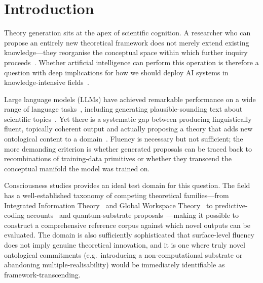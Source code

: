 \documentclass[pdflatex,sn-mathphys-num]{sn-jnl}
\begin{document}
\section{Introduction}
\label{sec:intro}

Theory generation sits at the apex of scientific cognition.  A researcher who
can propose an entirely new theoretical framework does not merely extend
existing knowledge---they reorganise the conceptual space within which further
inquiry proceeds~\cite{kuhn1962structure}.  Whether artificial intelligence can
perform this operation is therefore a question with deep implications for how we
should deploy AI systems in knowledge-intensive fields~\cite{findlay2025dissociating,miyanishi2024superficial}.

Large language models (LLMs) have achieved remarkable performance on a wide
range of language tasks~\cite{brown2020language,openai2023gpt4,geminiteam2023},
including generating plausible-sounding text about scientific
topics~\cite{stevenson2022gpt,organisciak2023beyond,zhang2025advancing}.  Yet there is a systematic
gap between producing linguistically fluent, topically coherent output and
actually proposing a theory that adds new ontological content to a
domain~\cite{boden2004creative,wiggins2006preliminary}.  Fluency is necessary
but not sufficient; the more demanding criterion is whether generated proposals
can be traced back to recombinations of training-data primitives or whether they
transcend the conceptual manifold the model was trained on.

Consciousness studies provides an ideal test domain for this question.  The
field has a well-established taxonomy of competing theoretical families---from
Integrated Information Theory~\cite{tononi2004information} and Global Workspace
Theory~\cite{baars2005global,dehaene2011experimental} to predictive-coding
accounts~\cite{friston2010free} and quantum-substrate
proposals~\cite{hameroff2014consciousness}---making it possible to construct a
comprehensive reference corpus against which novel outputs can be evaluated.  The
domain is also sufficiently sophisticated that surface-level fluency does not
imply genuine theoretical innovation, and it is one where truly novel
ontological commitments (e.g.\ introducing a non-computational substrate or
abandoning multiple-realisability) would be immediately identifiable as
framework-transcending.
\end{document}
